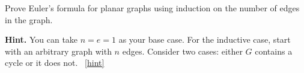 \documentclass{book}
\begin{document}
\setcounter{project}{25}
\addtocounter{project}{-1}
\begin{activity}[]\label{activity-20}
\hypertarget{p-273}{}%
Prove Euler's formula for planar graphs using induction on the number of edges in the graph.%
\par\smallskip%
\noindent\textbf{Hint.}\hypertarget{hint-7}{}\quad%
\hypertarget{p-274}{}%
You can take \(n = e = 1\) as your base case.  For the inductive case, start with an arbitrary graph with \(n\) edges.  Consider two cases: either \(G\) contains a cycle or it does not.%
~\hfill{\tiny\hyperlink{a-25}{[hint]}\hypertarget{q-25}{}}\end{activity}
\end{document}

